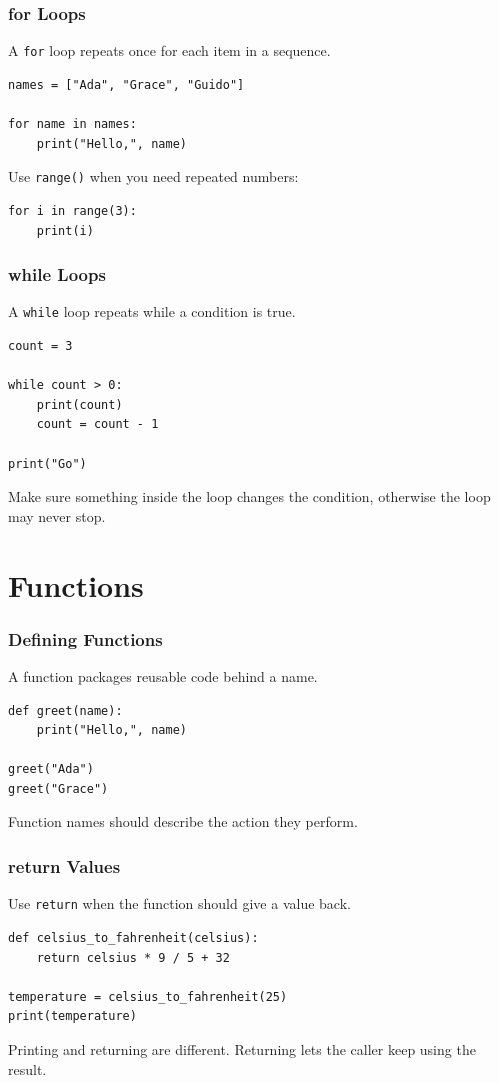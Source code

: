\documentclass{beamer}
\begin{document}
	\begin{frame}[fragile]
		\frametitle{for Loops}

		A \texttt{for} loop repeats once for each item in a sequence.
		\begin{lstlisting}
names = ["Ada", "Grace", "Guido"]

for name in names:
    print("Hello,", name)
		\end{lstlisting}

		Use \texttt{range()} when you need repeated numbers:
		\begin{lstlisting}
for i in range(3):
    print(i)
		\end{lstlisting}
	\end{frame}

	\begin{frame}[fragile]
		\frametitle{while Loops}

		A \texttt{while} loop repeats while a condition is true.
		\begin{lstlisting}
count = 3

while count > 0:
    print(count)
    count = count - 1

print("Go")
		\end{lstlisting}

		Make sure something inside the loop changes the condition, otherwise the
		loop may never stop.
	\end{frame}

	\section{Functions}
	\begin{frame}[fragile]
		\frametitle{Defining Functions}

		A function packages reusable code behind a name.
		\begin{lstlisting}
def greet(name):
    print("Hello,", name)

greet("Ada")
greet("Grace")
		\end{lstlisting}

		Function names should describe the action they perform.
	\end{frame}

	\begin{frame}[fragile]
		\frametitle{return Values}

		Use \texttt{return} when the function should give a value back.
		\begin{lstlisting}
def celsius_to_fahrenheit(celsius):
    return celsius * 9 / 5 + 32

temperature = celsius_to_fahrenheit(25)
print(temperature)
		\end{lstlisting}

		Printing and returning are different. Returning lets the caller keep
		using the result.
	\end{frame}
\end{document}
